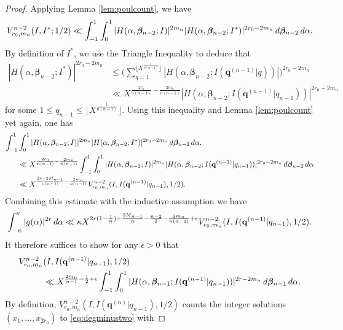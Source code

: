 \documentclass[10pt,a4paper]{amsart}
\renewcommand{\d}{\,{\rm d}}
\begin{document}
\begin{proof}
Applying Lemma \ref{lem:poulcount}, we have 
\[ V_{r_0,m_n}^{n-2}(I, I^* ;1/2) \ll \int_{-1}^{1} \int_{0}^{1} |H(\alpha,\boldsymbol{\beta}_{n-2};I )|^{2m_n} |H(\alpha,\boldsymbol{\beta}_{n-2};I^* )|^{2r_0-2m_n} \d \boldsymbol{\beta}_{n-2} \d \alpha. \]
By definition of $I^*$, we use the Triangle Inequality to deduce that 
\begin{align*} |H(\alpha,\boldsymbol{\beta}_{n-2};I^* )|^{2r_0-2m_n} & \leq \Big( \sum_{q = 1}^{\lfloor X^{\frac{1}{n(n-1)}} \rfloor} |H(\alpha,\boldsymbol{\beta}_{n-2};I({\mathbf{q}^{(n-1)}|q}) )|  \Big)^{2r_0-2m_n}
\\ 
& \ll X^{\frac{2r_0}{n(n-1)}-\frac{2m_n}{n(n-1)}} |H(\alpha,\boldsymbol{\beta}_{n-2};I({\mathbf{q}^{(n-1)}|q_{n-1}}) )|^{2r_0-2m_n}
\end{align*}
for some $1 \leq q_{n-1} \leq \lfloor X^{\frac{1}{n(n-1)}} \rfloor$. Using this inequality and Lemma \ref{lem:poulcount} yet again, one has 
\begin{align*} 
\int_{-1}^{1} & \int_{0}^{1} |H(\alpha,\boldsymbol{\beta}_{n-2};I )|^{2m_n} |H(\alpha,\boldsymbol{\beta}_{n-2};I^* )|^{2r_0-2m_n} \d \boldsymbol{\beta}_{n-2} \d \alpha.
\\ 
& \ll X^{\frac{2r_0}{n(n-1)}-\frac{2m_n}{n(n-1)}} \int_{-1}^{1} \int_{0}^{1} |H(\alpha,\boldsymbol{\beta}_{n-2};I )|^{2m_n} |H(\alpha,\boldsymbol{\beta}_{n-2};I({\mathbf{q}^{(n-1)}|q_{n-1}}) )|^{2r_0-2m_n} \d \boldsymbol{\beta}_{n-2} \d \alpha 
\\ 
& \ll X^{\frac{2r-2M_{n-1}}{n(n-1)}-\frac{2m_n}{n(n-1)}} V_{r_0,m_n}^{n-2}(I,I({\mathbf{q}^{(n-1)}|q_{n-1}}),1/2).
\end{align*}
Combining this estimate with the inductive assumption we have 
\begin{align*} 
\int_{-\kappa}^{\kappa} |g(\alpha)|^{2r} \d\alpha \ll \kappa X^{2r(1-\frac{1}{n})+\frac{2M_{n-1}}{n}-\frac{n-2}{2}-\frac{2m_{n}}{n(n-1)}+\epsilon} V_{r_0,m_n}^{n-2}(I,I({\mathbf{q}^{(n-1)}|q_{n-1}}),1/2). 
\end{align*}
It therefore suffices to show for any $\epsilon > 0$ that 
\begin{align*} V_{r_0,m_n}^{n-2} & (I,I({\mathbf{q}^{(n-1)}|q_{n-1}}),1/2) 
\\ 
& \ll X^{\frac{2m_n}{n-1}-\frac{1}{2}+\epsilon} \int_{-1}^{1} \int_{0}^{1} |H(\alpha,\boldsymbol{\beta}_{n-1};I({\mathbf{q}^{(n-1)}|q_{n-1}}) )|^{2r-2m_n} \d \boldsymbol{\beta}_{n-1} \d \alpha. 
\end{align*}
By definition, $V_{r_0,m_n}^{n-2}(I,I({\mathbf{q}^{(n)}|q_{n-1}}),1/2)$ counts the integer solutions $(x_1,\ldots,x_{2r_0})$ to \eqref{eq:degminustwo} with 

\end{proof}
\end{document}

